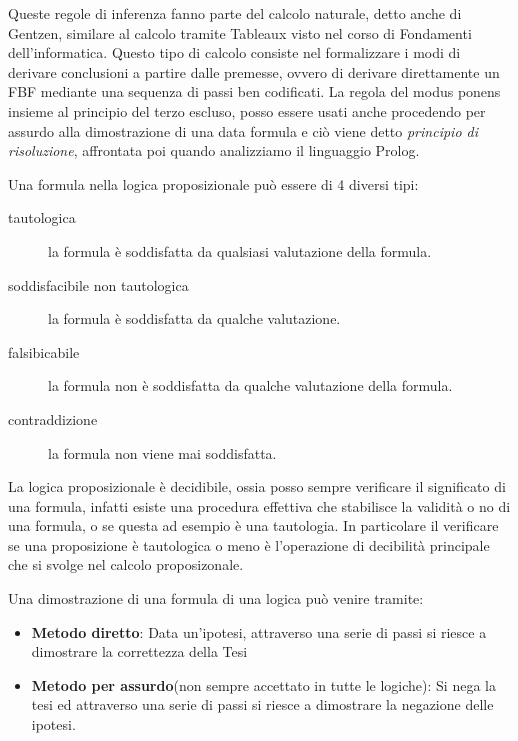 \documentclass[a4paper]{book}
\begin{document}
Queste regole di inferenza fanno parte del calcolo naturale, detto anche di Gentzen, similare al calcolo tramite Tableaux visto nel corso
di Fondamenti dell'informatica.\newline
Questo tipo di calcolo consiste nel formalizzare i modi di derivare conclusioni a partire dalle premesse, ovvero di derivare direttamente un FBF
mediante una sequenza di passi ben codificati.\newline
La regola del modus ponens  insieme al principio del terzo escluso, posso essere usati anche procedendo per assurdo alla dimostrazione
di una data formula e ciò viene detto \emph{principio di risoluzione}, affrontata poi quando analizziamo il linguaggio Prolog.

Una formula nella logica proposizionale può essere di 4 diversi tipi:
\begin{description}
    \item[tautologica] la formula è soddisfatta da qualsiasi valutazione della formula.
    \item[soddisfacibile non tautologica] la formula è soddisfatta da qualche valutazione.
    \item[falsibicabile] la formula non è soddisfatta da qualche valutazione della formula.
    \item[contraddizione] la formula non viene mai soddisfatta.
\end{description}

La logica proposizionale è decidibile, ossia posso sempre verificare il significato di una formula, infatti esiste
una procedura effettiva che stabilisce la validità o no di una formula, o se questa ad esempio è una tautologia.\newline
In particolare il verificare se una proposizione è tautologica o meno è l’operazione di decibilità principale che si svolge
nel calcolo proposizonale.

Una dimostrazione di una formula di una logica può venire tramite:
\begin{itemize}
  \item  \textbf{Metodo diretto}: Data un'ipotesi, attraverso una serie di passi
          si riesce a dimostrare la correttezza della Tesi
  \item \textbf{Metodo per assurdo}(non sempre accettato in tutte le logiche):
        Si nega la tesi ed attraverso una serie di passi si riesce a dimostrare
        la negazione delle ipotesi.
\end{itemize}
\end{document}

